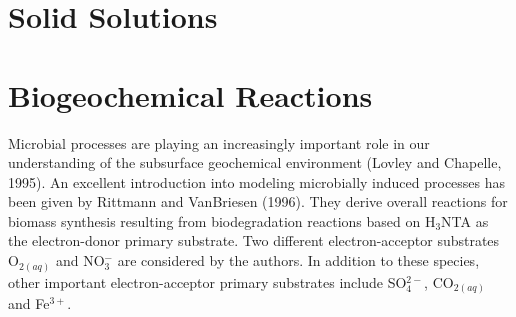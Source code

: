 \documentclass[12pt]{article}
\def\EQ#1\EN{\begin{equation}#1\end{equation}}
\newcommand{\eq}{\ =\ }
\newcommand{\kin}{{\rm kin}}
\newcommand{\p}{{\partial}}
\newcommand{\R}{{{\mathcal R}}}
\newcommand{\bnabla}{\boldsymbol{\nabla}}
\newcommand{\bdot}{\boldsymbol{\cdot}}
\newcommand{\bq}{\boldsymbol{q}}
\begin{document}

\section{Solid Solutions}

\setcounter{equation}{0}

\section{Biogeochemical Reactions}

\setcounter{equation}{0}

Microbial processes are playing an increasingly important role in our understanding of the subsurface geochemical environment (Lovley and Chapelle, 1995). An excellent introduction into modeling microbially induced processes has been given by Rittmann and VanBriesen (1996). They derive overall reactions for biomass synthesis resulting from biodegradation reactions based on H$_3$NTA as the electron-donor primary substrate. Two different electron-acceptor substrates O$_{2(aq)}$ and NO$_3^-$ are considered by the authors. In addition to these species, other important electron-acceptor primary substrates include SO$_4^{2-}$, CO$_{2(aq)}$ and Fe$^{3+}$. 
\end{document}
